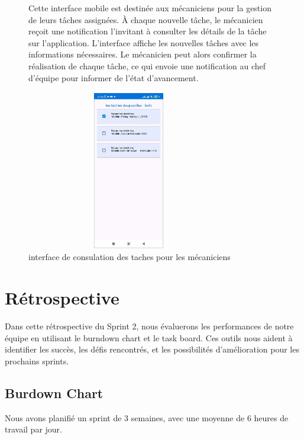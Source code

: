 \begin{figure}[htbp]
  \centering
  \begin{minipage}{0.58\textwidth}
    \raggedright
    Cette interface mobile est destinée aux mécaniciens pour la gestion de leurs tâches assignées. À chaque nouvelle tâche, le mécanicien reçoit une notification l'invitant à consulter les détails de la tâche sur l'application. L'interface affiche les nouvelles tâches avec les informations nécessaires. Le mécanicien peut alors confirmer la réalisation de chaque tâche, ce qui envoie une notification au chef d'équipe pour informer de l'état d'avancement.
  \end{minipage}
  \hfill
  \begin{minipage}{0.39\textwidth}
    \centering
    \includegraphics[width=0.8\textwidth,height=7cm]{chap4.images/consulation des taches.png}
    \caption{interface de consulation des taches pour les mécaniciens }
  \end{minipage}
\end{figure}






\section{Rétrospective}
Dans cette rétrospective du Sprint 2, nous évaluerons les performances de notre équipe en utilisant le burndown chart et le task board. Ces outils nous aident à identifier les succès, les défis rencontrés, et les possibilités d'amélioration pour les prochains sprints.
\newpage
\subsection{Burdown Chart}
Nous avons planifié un sprint de 3 semaines, avec une moyenne de 6 heures de travail par jour.


